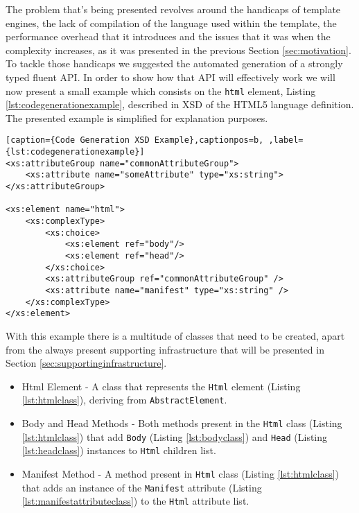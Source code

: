 The problem that's being presented revolves around the handicaps of template engines, the lack of compilation of the language used within the template, the performance overhead that it introduces and the issues that it was when the complexity increases, as it was presented in the previous Section \ref{sec:motivation}. To tackle those handicaps we suggested the automated generation of a strongly typed fluent \ac{API}. In order to show how that \ac{API} will effectively work we will now present a small example which consists on the \texttt{html} element, Listing \ref{lst:codegenerationexample}, described in \ac{XSD} of the \ac{HTML}5 language definition. The presented example is simplified for explanation purposes.

\bigskip


\begin{minipage}{\linewidth}
\begin{lstlisting}[caption={Code Generation XSD Example},captionpos=b, ,label={lst:codegenerationexample}]
<xs:attributeGroup name="commonAttributeGroup">
    <xs:attribute name="someAttribute" type="xs:string">
</xs:attributeGroup>

<xs:element name="html">
    <xs:complexType>
        <xs:choice>
            <xs:element ref="body"/>
            <xs:element ref="head"/>
        </xs:choice>
        <xs:attributeGroup ref="commonAttributeGroup" />
        <xs:attribute name="manifest" type="xs:string" />
    </xs:complexType>
</xs:element>
\end{lstlisting}
\end{minipage}

\noindent
With this example there is a multitude of classes that need to be created, apart from the always present supporting infrastructure that will be presented in Section \ref{sec:supportinginfrastructure}. 

\begin{itemize}
	\item Html Element - A class that represents the \texttt{Html} element (Listing \ref{lst:htmlclass}), deriving from \texttt{AbstractElement}.
	\item Body and Head Methods - Both methods present in the \texttt{Html} class (Listing \ref{lst:htmlclass}) that add \texttt{Body} (Listing \ref{lst:bodyclass}) and \texttt{Head} (Listing \ref{lst:headclass}) instances to \texttt{Html} children list.
	\item Manifest Method - A method present in \texttt{Html} class (Listing \ref{lst:htmlclass}) that adds an instance of the \texttt{Manifest} attribute (Listing \ref{lst:manifestattributeclass}) to the \texttt{Html} attribute list.
\end{itemize}

